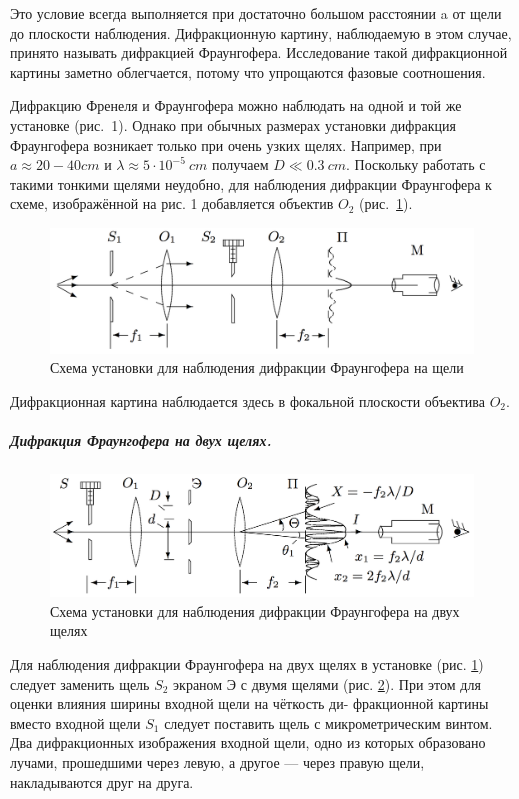 \documentclass[12pt]{article}
\newcommand{\lw}{\linewidth}
\begin{document}
	Это условие всегда выполняется при достаточно большом расстоянии a от щели до плоскости наблюдения. Дифракционную картину, наблюдаемую в этом случае, принято называть дифракцией Фраунгофера. Исследование такой дифракционной картины заметно облегчается, потому что упрощаются фазовые соотношения.
	
	Дифракцию Френеля и Фраунгофера можно наблюдать на одной и той же установке (рис.~1). Однако при обычных размерах установки дифракция Фраунгофера возникает только при очень узких щелях. Например, при $a \approx 20-40cm$ и $\lambda \approx 5 \cdot 10^{-5}~cm$ получаем $D \ll 0.3~cm$. Поскольку работать с такими тонкими щелями неудобно, для наблюдения дифракции Фраунгофера к схеме, изображённой на рис. 1 добавляется объектив $O_2$ (рис.~\ref{img:fraung}).
	
	\begin{figure}[h]
		\centering
		\includegraphics[width = 0.9 \lw]{img2}
		\caption{Схема установки для наблюдения дифракции Фраунгофера на щели}
		\label{img:fraung}
	\end{figure}
	
	Дифракционная картина наблюдается здесь в фокальной плоскости объектива $O_2$.
	
	
	\subparagraph{Дифракция Фраунгофера на двух щелях.}
	
	\begin{figure}[h]
		\centering
		\includegraphics[width = 0.9 \lw]{img3}
		\caption{Схема установки для наблюдения дифракции Фраунгофера на двух щелях}
		\label{img:fraung_2}
	\end{figure}
	
	
	Для наблюдения дифракции Фраунгофера на двух щелях в установке (рис. \ref{img:fraung}) следует заменить щель $S_2$ экраном Э с двумя щелями (рис. \ref{img:fraung_2}). При этом для оценки влияния ширины входной щели на чёткость ди- фракционной картины вместо входной щели $S_1$ следует поставить щель с микрометрическим винтом. Два дифракционных изображения входной щели, одно из которых образовано лучами, прошедшими через левую, а другое — через правую щели, накладываются друг на друга.
	
\end{document}

